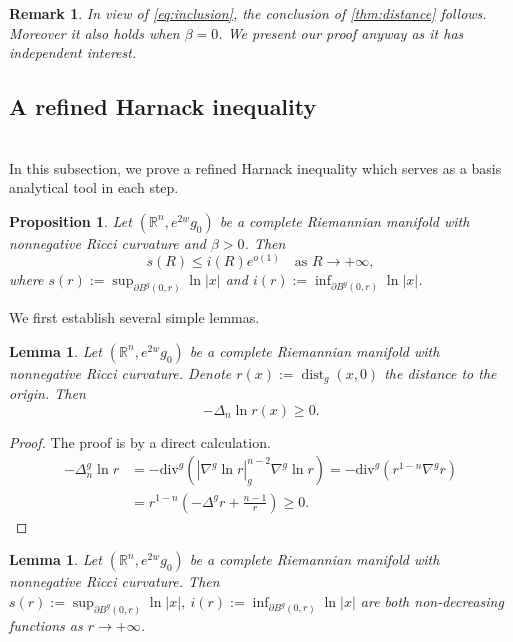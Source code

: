 \documentclass[10pt,a4paper]{amsart}
\newtheorem{proposition}[theorem]{Proposition}
\newtheorem{lemma}[theorem]{Lemma}
\newtheorem{remark}[theorem]{Remark}
\numberwithin{equation}{section}
\newcommand{\nablag}{\nabla^g} %
\begin{document}
\begin{remark}
In view of \cref{eq:inclusion}, the conclusion of \cref{thm:distance} follows. Moreover it also holds when $\beta=0$. We present our proof anyway as it has independent interest. 
\end{remark}

\subsection{A refined Harnack inequality}
 \ \\
In this subsection, we prove a refined Harnack inequality which serves as a basis analytical tool in each step.

\begin{proposition}\label{proposition. Harnack ineq.}
    Let $(\mathbb{R}^n,e^{2w}g_0)$ be a complete Riemannian manifold with nonnegative Ricci curvature and $\beta>0$.
    Then 
    \[
        s(R)\leq i(R) e^{o(1)} \quad \text{as }R\to +\infty,
    \]
    where $s(r):=\sup_{\partial B^g(0,r) }\ln |x| $ and $i(r):=\inf_{\partial B^g(0,r)}\ln |x| $.
\end{proposition}

We first establish several simple lemmas.  
\begin{lemma}
     Let $(\mathbb{R}^n,e^{2w}g_0)$ be a complete Riemannian manifold with nonnegative Ricci curvature. Denote $r(x):=\operatorname{dist}_g(x,0)$ the distance to the origin.
     Then 
     \[
         -\Delta_n \ln r(x)\geq 0.
     \]
\end{lemma}
\begin{proof}
    The proof is by a direct calculation.
    \begin{align*}
        -\Delta_n^g \ln r
        &=-\mathrm{div}^g
        (|\nabla^g \ln r|_g^{n-2}\nablag \ln r)
        =-\mathrm{div}^g(r^{1-n}\nablag r)\\
        &=r^{1-n}\left(-\Delta^g r+\frac{n-1}{r}\right)\geq 0.
    \end{align*}
\end{proof}

\begin{lemma}\label{lemma. nondecreasing of i(r)}
    Let $(\mathbb{R}^n,e^{2w}g_0)$ be a complete Riemannian manifold with nonnegative Ricci curvature. 
     Then  $s(r):=\sup_{\partial B^g(0,r)}\ln |x|,\   i(r):=\inf_{\partial B^g(0,r)}\ln |x|$ are both non-decreasing functions as $r\to +\infty$.
\end{lemma}
\end{document}
